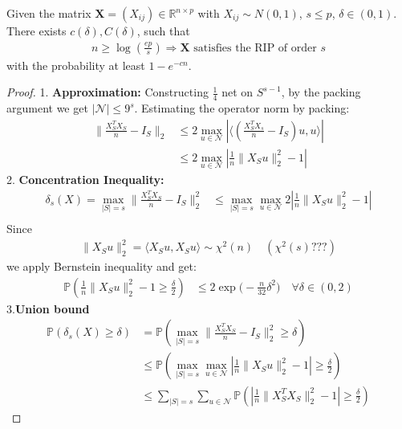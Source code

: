 \begin{theorem}
	Given the matrix $\mathbf{X} = (X_{ij}) \in \mathbb{R}^{n \times p}$ with $X_{ij} \sim N(0, 1)$, $s \le p$, $\delta \in (0, 1)$. There exists $c(\delta), C(\delta)$, such that
	\begin{align*}
		n \ge \log(\frac{ep}{s}) \Rightarrow \text{$\mathbf{X}$ satisfies the RIP of order $s$}
	\end{align*}
	with the probability at least $1 - e^{-cn}$.
\end{theorem}
\begin{proof}
	1. \textbf{Approximation:} Constructing $\frac{1}{4}$ net on $S^{s -1}$, by the packing argument we get $|\mathcal{N}| \le 9^s $. Estimating the operator norm by packing:   
	\begin{align*}
		\|\frac{X_S^T X_S}{n} - I_S\|_2 &\le 2 \max_{u \in \mathcal{N}} |\langle (\frac{X_S^T X_s}{n} - I_S)u, u \rangle|\\
		&\le 2\max_{u \in \mathcal{N}} |\frac{1}{n} \|X_Su\|^2_2 - 1|
	\end{align*}
	2. \textbf{Concentration Inequality:}
	\begin{align*}
		\delta_s(X) = \max_{|S| = s}  \|\frac{X^T_S X_S}{n} - I_S\|_2^2
		 &\le \max_{|S| = s} \max_{u \in \mathcal{N}} 2| \frac{1}{n} \|X_Su \|^2_2 - 1|\\
	\end{align*}
	Since
	\begin{align*}
		\|X_S u\|_2^2 = \langle X_S u, X_Su\rangle \sim \chi^2(n)\quad (\chi^2(s)???)
	\end{align*}
	we apply Bernstein inequality and get:
	\begin{align*}
		\mathbb{P}(\frac{1}{n} \|X_Su \|_2^2 - 1 \ge \frac{\delta}{2}) &\le 2\exp\bigg(-\frac{n}{32} \delta^2\bigg) \quad \forall \delta \in (0, 2)
	\end{align*}
	3.\textbf{Union bound}
	\begin{align*}
		\mathbb{P}(\delta_s(X) \ge \delta) &= \mathbb{P}(\max_{|S| = s}  \|\frac{X^T_S X_S}{n} - I_S\|_2^2 \ge \delta)  \\
		&\le \mathbb{P}(\max_{|S| = s} \max_{u \in \mathcal{N}} |\frac{1}{n} \|X_Su \|^2_2 - 1| \ge \frac{\delta}{2})   \\
		&\le \sum_{|S| = s} \sum_{u \in \mathcal{N}}\mathbb{P}(|\frac{1}{n}\|X_S^T X_S\|^2_2 - 1| \geq \frac{\delta}{2})
	\end{align*}
\end{proof}



